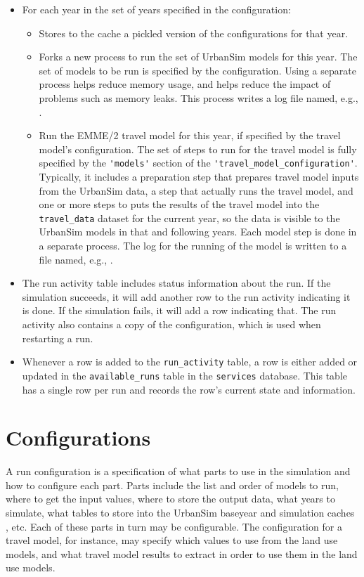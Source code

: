 \begin{itemize}
\item For each year in the set of years specified in the configuration:
  \begin{itemize}
  \item Stores to the cache a pickled version of the configurations for that
  year.
  \item Forks a new process to run the set of UrbanSim models \modelsindex for this year.
  The set of models \modelsindex to be run is specified by the configuration. Using a
  separate process helps reduce memory usage,  and helps reduce the impact of problems such as memory leaks.  This
  process writes a log file named, e.g., .
  \item Run the EMME/2 \emmeindex travel model for this year, if specified by the travel
  model's configuration.  The set of steps to run for the travel model is fully
  specified by the \verb|'models'| \modelsindex section of the
  \verb|'travel_model_configuration'|. Typically, it includes a preparation step
  that prepares travel model inputs from the UrbanSim data, a step that
  actually runs the travel model, and one or more steps to puts the results of
  the travel model into the \verb|travel_data| dataset for the current year, so
  the data is visible to the UrbanSim models \modelsindex in that and following years.  Each
  model step is done in a separate process.  The log for the running of the
  model is written to a file named, e.g., . \emmeindex
  \end{itemize}
  \item The run activity table includes status information about the run.  If
  the simulation succeeds, it will add another row to the run activity
  indicating it is done.  If the simulation fails, it will add a row indicating
  that.  The run activity also contains a copy of the configuration, which is
  used when restarting a run.
  \item Whenever a row is added to the \verb|run_activity| table, a row is
  either added or updated in the \verb|available_runs| table in the
  \verb|services| database. This table has a single row per run and records the
  row's current state and information.
\end{itemize}

\section{Configurations}
\label{sec:configuration}
%
A run configuration is a specification of what parts to use in the simulation
and how to configure each part.  Parts include the list and order of models \modelsindex to
run, where to get the input values, where to store the output data, what years
to simulate, what tables to store into the UrbanSim baseyear and simulation
caches \baseyearcacheindex\simulationcacheindex, etc. Each of these parts in
turn may be configurable.  The configuration for a travel model, for instance,
may specify which values to use from the land use models, \modelsindex and what travel model
results to extract in order to use them in the land use models. \modelsindex

